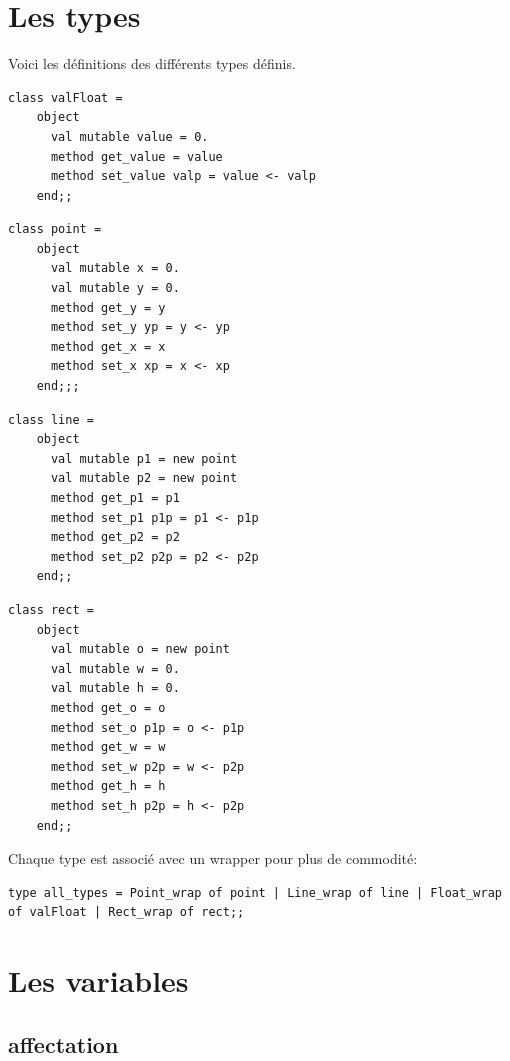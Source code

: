 \documentclass[11pt]{report} %
\begin{document}
\section{Les types}

Voici les définitions des différents types définis.

\begin{lstlisting}[caption=type Float, language=caml]
class valFloat =
    object
      val mutable value = 0.
      method get_value = value
      method set_value valp = value <- valp
    end;;
\end{lstlisting}

\begin{lstlisting}[caption=type Point, language=caml]
class point =
    object
      val mutable x = 0.
      val mutable y = 0.
      method get_y = y
      method set_y yp = y <- yp
      method get_x = x
      method set_x xp = x <- xp
    end;;;
\end{lstlisting}

\begin{lstlisting}[caption=type Line, language=caml]
class line =
    object
      val mutable p1 = new point
      val mutable p2 = new point
      method get_p1 = p1
      method set_p1 p1p = p1 <- p1p
      method get_p2 = p2
      method set_p2 p2p = p2 <- p2p
    end;;
\end{lstlisting}

\begin{lstlisting}[caption=type Rect, language=caml]
class rect =
    object
      val mutable o = new point
      val mutable w = 0.
      val mutable h = 0.
      method get_o = o
      method set_o p1p = o <- p1p
      method get_w = w
      method set_w p2p = w <- p2p
      method get_h = h
      method set_h p2p = h <- p2p
    end;;
\end{lstlisting}

Chaque type est associé avec un wrapper pour plus de commodité:

\begin{lstlisting}[caption=Wrapper, language=caml]
type all_types = Point_wrap of point | Line_wrap of line | Float_wrap of valFloat | Rect_wrap of rect;;
\end{lstlisting}

\section{Les variables}

\subsection{affectation}
\end{document}

